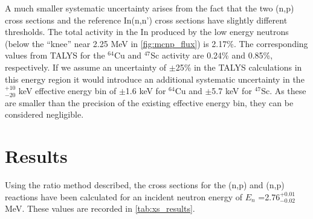 A much smaller systematic uncertainty arises from the fact that the two (n,p) cross sections and the reference In(n,n') cross sections have slightly different thresholds.  
The total activity in the In produced by the low energy neutrons (below the \enquote{knee} near 2.25 MeV in  \autoref{fig:mcnp_flux}) is 2.17\%.  
The corresponding values from TALYS for the $^{64}$Cu and $^{47}$Sc activity are 0.24\% and 0.85\%, respectively.  
If we assume an uncertainty of $\pm$25\% in the TALYS calculations in this energy region it would introduce an additional systematic uncertainty in the $^{+10}_{-20}$ keV effective energy bin of $\pm$1.6 keV for $^{64}$Cu and $\pm$5.7 keV for $^{47}$Sc. 
As these are smaller than the precision of the existing effective energy bin, they can be considered negligible.













\section{Results}


Using the ratio method described, the cross sections for the (n,p) and (n,p) reactions have been calculated for an incident neutron energy of $E_n$ =2.76$^{+0.01}_{-0.02}$ MeV.
These values are recorded in \autoref{tab:xs_results}.




